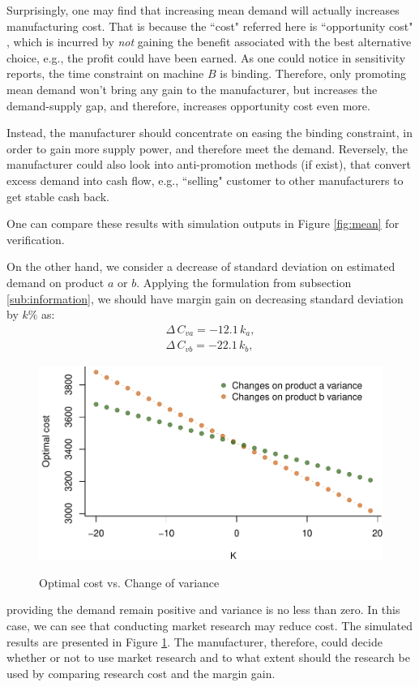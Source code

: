 \documentclass[a4paper,11pt]{article}
\begin{document}
Surprisingly, one may find that increasing mean demand will actually increases manufacturing cost. That is because the ``cost" referred here is ``opportunity cost" \cite{Ch12,Po02}, which is incurred by \emph{not} gaining the benefit associated with the best alternative choice, e.g., the profit could have been earned. As one could notice in sensitivity reports, the time constraint on machine $B$ is binding. Therefore, only promoting mean demand won't bring any gain to the manufacturer, but increases the demand-supply gap, and therefore, increases opportunity cost even more.

Instead, the manufacturer should concentrate on easing the binding constraint, in order to gain more supply power, and therefore meet the demand. Reversely, the manufacturer could also look into anti-promotion methods (if exist), that convert excess demand into cash flow, e.g., ``selling" customer to other manufacturers to get stable cash back.

One can compare these results with simulation outputs in Figure \ref{fig:mean} for verification.

On the other hand, we consider a decrease of standard deviation on estimated demand on product $a$ or $b$. Applying the formulation from subsection \ref{sub:information}, we should have margin gain on decreasing standard deviation by $k\%$ as:
\[
\begin{aligned}
    \Delta \, C_{va} = -12.1 \, k_a,\\
    \Delta \, C_{vb} = -22.1 \, k_b,
\end{aligned}
\]

\begin{figure}[htb]
\centering
\caption{Optimal cost vs. Change of variance}
\includegraphics{Example-figure_files/figure-latex/var-1.pdf}
\label{fig:var}
\end{figure}
providing the demand remain positive and variance is no less than zero. In this case, we can see that conducting market research may reduce cost. The simulated results are presented in Figure \ref{fig:var}. The manufacturer, therefore, could decide whether or not to use market research and to what extent should the research be used by comparing research cost and the margin gain.
\end{document}
